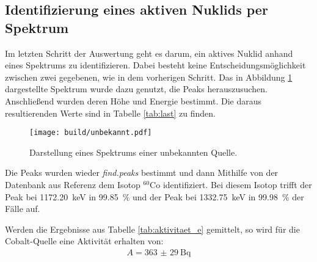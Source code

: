 \subsection{Identifizierung eines aktiven Nuklids per Spektrum}
\label{sec:Nuklidbestimmung}
Im letzten Schritt der Auswertung geht es darum, ein aktives Nuklid anhand eines
Spektrums zu identifizieren. Dabei besteht keine Entscheidungsmöglichkeit zwischen
zwei gegebenen, wie in dem vorherigen Schritt.
Das in Abbildung \ref{plt:unbekannt} dargestellte Spektrum wurde dazu genutzt, die Peaks herauszusuchen.
Anschließend wurden deren Höhe und Energie bestimmt. Die daraus
resultierenden Werte sind in Tabelle \ref{tab:last} zu finden.

\begin{figure}[htb]
  \centering
  \texttt{[image: build/unbekannt.pdf]}
  \caption{Darstellung eines Spektrums einer unbekannten Quelle.}
  \label{plt:unbekannt}
\end{figure}
Die Peaks wurden wieder  \textit{find.peaks} bestimmt und dann Mithilfe von der
Datenbank aus Referenz \cite{referenz} dem Isotop $^{60}\text{Co}$ identifiziert.
Bei diesem Isotop trifft der Peak bei \SI{1172.20}{\kilo\electronvolt} in
\SI{99.85}{\percent} und der Peak bei \SI{1332.75}{\kilo\electronvolt} in
\SI{99.98}{\percent} der Fälle auf.

Werden die Ergebnisse aus Tabelle \ref{tab:aktivitaet_e} gemittelt, so wird für die
Cobalt-Quelle eine Aktivität erhalten von:
\begin{align*}
  A = \SI{363(29)}{\becquerel}
\end{align*}
